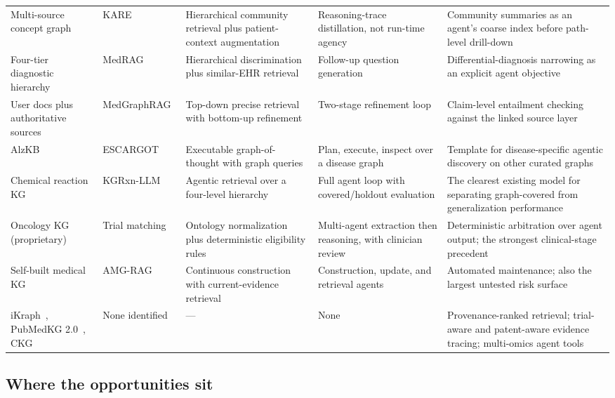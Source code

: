 \begin{table}[!t]
\begin{tabularx}{\textwidth}{@{}L{2.1cm} L{2.7cm} L{3.2cm} L{2.6cm} Y@{}}
Multi-source concept graph & KARE~\cite{jiang2025kare} & Hierarchical community retrieval plus patient-context augmentation & Reasoning-trace distillation, not run-time agency & Community summaries as an agent's coarse index before path-level drill-down \\
Four-tier diagnostic hierarchy & MedRAG~\cite{zhao2025medrag} & Hierarchical discrimination plus similar-EHR retrieval & Follow-up question generation & Differential-diagnosis narrowing as an explicit agent objective \\
User docs plus authoritative sources & MedGraphRAG~\cite{wu2025medgraphrag} & Top-down precise retrieval with bottom-up refinement & Two-stage refinement loop & Claim-level entailment checking against the linked source layer \\
AlzKB & ESCARGOT~\cite{matsumoto2025escargot} & Executable graph-of-thought with graph queries & Plan, execute, inspect over a disease graph & Template for disease-specific agentic discovery on other curated graphs \\
Chemical reaction KG & KGRxn-LLM~\cite{liu2026kgrxn} & Agentic retrieval over a four-level hierarchy & Full agent loop with covered/holdout evaluation & The clearest existing model for separating graph-covered from generalization performance \\
Oncology KG (proprietary) & Trial matching~\cite{loaizabonilla2026trialmatch} & Ontology normalization plus deterministic eligibility rules & Multi-agent extraction then reasoning, with clinician review & Deterministic arbitration over agent output; the strongest clinical-stage precedent \\
Self-built medical KG & AMG-RAG~\cite{rezaei2025amgrag} & Continuous construction with current-evidence retrieval & Construction, update, and retrieval agents & Automated maintenance; also the largest untested risk surface \\
iKraph~\cite{zhang2025ikraph}, PubMedKG 2.0~\cite{xu2025pubmedkg}, CKG~\cite{santos2022ckg} & None identified & --- & None & Provenance-ranked retrieval; trial-aware and patent-aware evidence tracing; multi-omics agent tools \\
\bottomrule
\end{tabularx}
\end{table}

\subsection{Where the opportunities sit}

